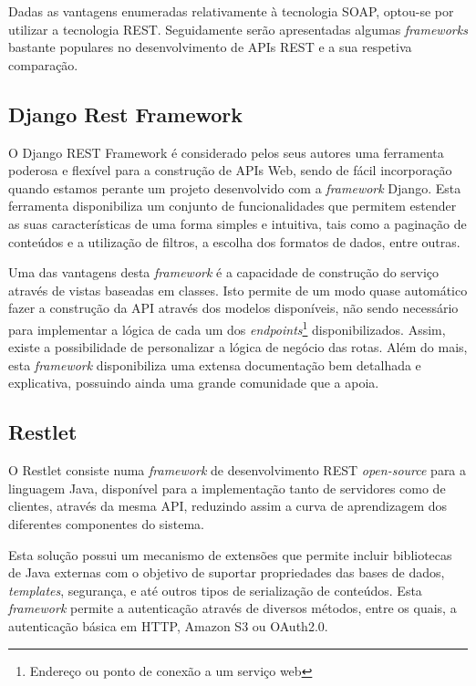 Dadas as vantagens enumeradas relativamente à tecnologia \ac{SOAP}, optou-se por utilizar a tecnologia \ac{REST}. Seguidamente serão apresentadas algumas \textit{frameworks} bastante populares no desenvolvimento de APIs \ac{REST} e a sua respetiva comparação. 



\subsection{Django Rest Framework}



O Django REST Framework é considerado pelos seus autores uma ferramenta poderosa e flexível para a construção de APIs Web\cite{restdjango}, sendo de fácil incorporação quando estamos perante um projeto desenvolvido com a \textit{framework} Django. Esta ferramenta disponibiliza um conjunto de funcionalidades que permitem estender as suas características de uma forma simples e intuitiva, tais como a paginação de conteúdos e a utilização de filtros, a escolha dos formatos de dados, entre outras.


Uma das vantagens desta \textit{framework} é a capacidade de construção do serviço através de vistas baseadas em classes. Isto permite de um modo quase automático fazer a construção da API através dos modelos disponíveis, não sendo necessário para implementar a lógica de cada um dos \textit{endpoints}\footnote{Endereço ou ponto de conexão a um serviço web} disponibilizados. Assim, existe a possibilidade de personalizar a lógica de negócio das rotas. Além do mais, esta \textit{framework} disponibiliza uma extensa documentação bem detalhada e explicativa, possuindo ainda uma grande comunidade que a apoia. 












\subsection{Restlet}

O Restlet consiste numa \textit{framework} de desenvolvimento \ac{REST} \textit{open-source} para a linguagem Java, disponível para a implementação tanto de servidores como de clientes, através da mesma \ac{API}, reduzindo assim a curva de aprendizagem dos diferentes componentes do sistema. 

Esta solução possui um mecanismo de extensões que permite incluir bibliotecas de Java externas com o objetivo de suportar propriedades das bases de dados, \textit{templates}, segurança, e até outros tipos de serialização de conteúdos. Esta \textit{framework} permite a autenticação através de diversos métodos, entre os quais, a autenticação básica em \ac{HTTP}, Amazon S3 ou OAuth2.0.


